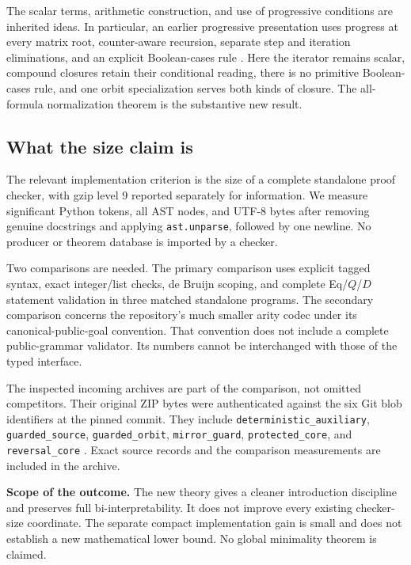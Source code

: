 The scalar terms, arithmetic construction, and use of progressive
conditions are inherited ideas. In particular, an earlier progressive
presentation uses progress at every matrix root, counter-aware recursion,
separate step and iteration eliminations, and an explicit Boolean-cases
rule \cite{progressive}. Here the iterator remains scalar, compound
closures retain their conditional reading, there is no primitive
Boolean-cases rule, and one orbit specialization serves both kinds of
closure. The all-formula normalization theorem is the substantive new
result.

\subsection{What the size claim is}

The relevant implementation criterion is the size of a complete
standalone proof checker, with gzip level 9 reported separately for
information. We measure significant Python tokens, all AST nodes, and
UTF-8 bytes after removing genuine docstrings and applying
\texttt{ast.unparse}, followed by one newline. No producer or theorem
database is imported by a checker.

Two comparisons are needed. The primary comparison uses explicit tagged
syntax, exact integer/list checks, de Bruijn scoping, and complete
Eq/$Q$/$D$ statement validation in three matched standalone programs.
The secondary comparison concerns the repository's much smaller arity
codec under its canonical-public-goal convention. That convention does
not include a complete public-grammar validator. Its numbers cannot be
interchanged with those of the typed interface.

The inspected incoming archives are part of the comparison, not omitted
competitors. Their original ZIP bytes were authenticated against the six
Git blob identifiers at the pinned commit. They include
\texttt{deterministic\_auxiliary}, \texttt{guarded\_source},
\texttt{guarded\_orbit}, \texttt{mirror\_guard},
\texttt{protected\_core}, and \texttt{reversal\_core}
\cite{incoming}. Exact source records and the comparison measurements
are included in the archive.

\textbf{Scope of the outcome.}
The new theory gives a cleaner introduction discipline and preserves full
bi-interpretability. It does not improve every existing checker-size
coordinate. The separate compact implementation gain is small and does
not establish a new mathematical lower bound. No global minimality
theorem is claimed.
